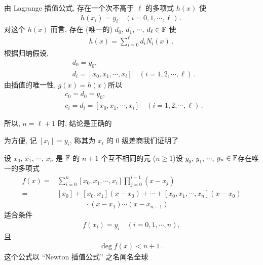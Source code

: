 \begin{pf}
    由 Lagrange 插值公式, 存在一个次不高于 $\ell$ 的多项式 $h(x)$ 使
    \begin{align*}
        h(x_i) = y_i \quad (i = 0,1,\cdots,\ell) \period
    \end{align*}
    对这个 $h(x)$ 而言, 存在 (唯一的) $d_0$, $d_1$, $\cdots$, $d_{\ell} \in \mathbb{F}$ 使
    \begin{align*}
        h(x) = \sum_{i = 0}^{\ell} d_i N_{i} (x) \period
    \end{align*}
    根据归纳假设,
    \begin{align*}
         & d_0 = y_0,                                                        \\
         & d_i = [x_0, x_1, \cdots, x_i] \quad (i = 1,2,\cdots,\ell) \period
    \end{align*}
    由插值的唯一性, $g(x) = h(x)$\period 所以
    \begin{align*}
         & c_0 = d_0 = y_0,                                                        \\
         & c_i = d_i = [x_0, x_1, \cdots, x_i] \quad (i = 1,2,\cdots,\ell) \period
    \end{align*}

    所以, $n = \ell + 1$ 时, 结论是正确的\period
\end{pf}

为方便, 记 $[x_i] = y_i$, 称其为 $x_i$ 的 $0$ 级差商\period 我们证明了

\begin{proposition}
    设 $x_0$, $x_1$, $\cdots$, $x_{n}$ 是 $\mathbb{F}$ 的 $n+1$ 个互不相同的元 ($n \geq 1$)\period 设 $y_0$, $y_1$, $\cdots$, $y_{n} \in \mathbb{F}$\period 存在唯一的多项式
    \begin{align*}
        f(x)
        = {} & \sum_{i = 0}^{n} [x_0, x_1, \cdots, x_i]
        \prod_{j = 0}^{i - 1} (x - x_j)                                                \\
        = {} & [x_0] + [x_0, x_1] (x - x_0) + \cdots + [x_0, x_1, \cdots, x_n] (x-x_0) \\
             & \qquad \qquad \cdot (x-x_1)\cdots (x-x_{n-1})
    \end{align*}
    适合条件
    \begin{align*}
        f(x_i) = y_i \quad (i = 0,1,\cdots,n),
    \end{align*}
    且
    \begin{align*}
        \deg f(x) < n + 1 \period
    \end{align*}
    这个公式以 ``Newton 插值公式''  之名闻名全球\period
\end{proposition}

